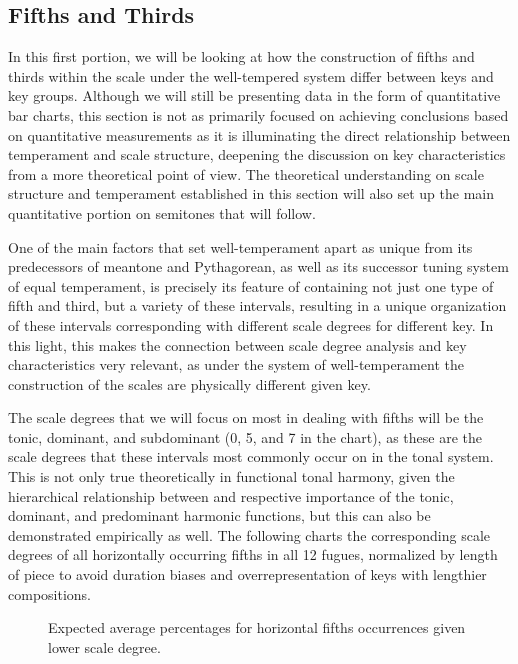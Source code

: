     \subsection{Fifths and Thirds}\label{fifths-and-thirds}

    In this first portion, we will be looking at how the construction of
fifths and thirds within the scale under the well-tempered system differ
between keys and key groups. Although we will still be presenting data
in the form of quantitative bar charts, this section is not as primarily
focused on achieving conclusions based on quantitative measurements as
it is illuminating the direct relationship between temperament and scale
structure, deepening the discussion on key characteristics from a more
theoretical point of view. The theoretical understanding on scale
structure and temperament established in this section will also set up
the main quantitative portion on semitones that will follow.

One of the main factors that set well-temperament apart as unique from
its predecessors of meantone and Pythagorean, as well as its successor
tuning system of equal temperament, is precisely its feature of
containing not just one type of fifth and third, but a variety of these
intervals, resulting in a unique organization of these intervals
corresponding with different scale degrees for different key. In this
light, this makes the connection between scale degree analysis and key
characteristics very relevant, as under the system of well-temperament
the construction of the scales are physically different given key.

The scale degrees that we will focus on most in dealing with fifths will
be the tonic, dominant, and subdominant (0, 5, and 7 in the chart), as
these are the scale degrees that these intervals most commonly occur on
in the tonal system. This is not only true theoretically in functional
tonal harmony, given the hierarchical relationship between and
respective importance of the tonic, dominant, and predominant harmonic
functions, but this can also be demonstrated empirically as well. The
following charts the corresponding scale degrees of all horizontally
occurring fifths in all 12 fugues, normalized by length of piece to
avoid duration biases and overrepresentation of keys with lengthier
compositions.




\begin{figure}[H]
    \begin{center}
    \caption{Expected average percentages for horizontal fifths occurrences given lower scale degree. }
    \end{center}
\end{figure}
    
